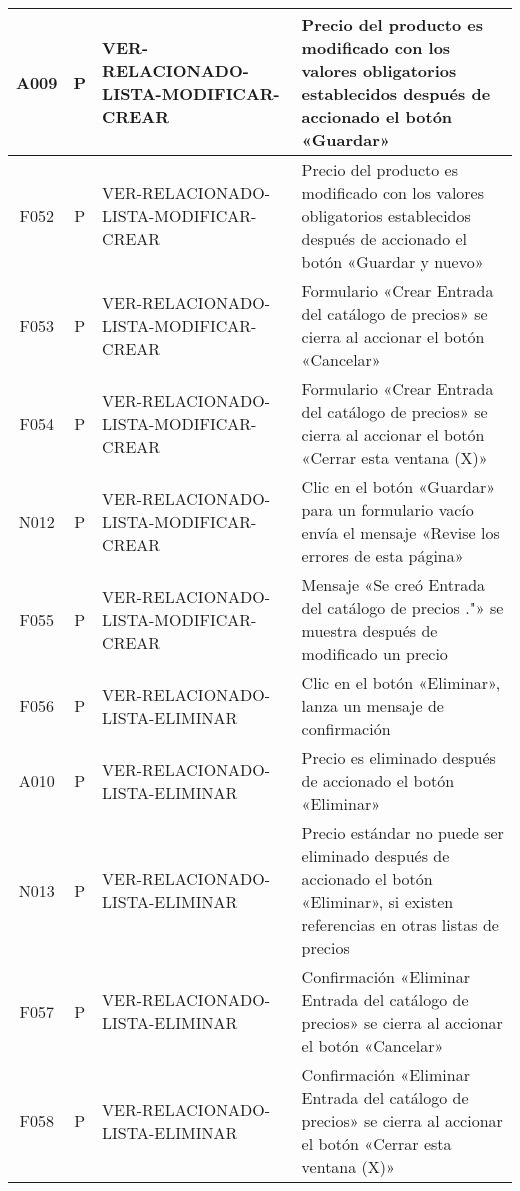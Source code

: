 \begin{landscape}
{\begin{longtable}[htb]{|c|c|p{3.8cm}|p{15.2cm}|}
\scriptsize{A009} & \scriptsize{P} & \scriptsize{VER-RELACIONADO-LISTA-MODIFICAR-CREAR} & \scriptsize{Precio del producto es modificado con los valores obligatorios establecidos después de accionado el botón «Guardar»} \\ \hline
\scriptsize{F052} & \scriptsize{P} & \scriptsize{VER-RELACIONADO-LISTA-MODIFICAR-CREAR} & \scriptsize{Precio del producto es modificado con los valores obligatorios establecidos después de accionado el botón «Guardar y nuevo»} \\ \hline
\scriptsize{F053} & \scriptsize{P} & \scriptsize{VER-RELACIONADO-LISTA-MODIFICAR-CREAR} & \scriptsize{Formulario «Crear Entrada del catálogo de precios» se cierra al accionar el botón «Cancelar»} \\ \hline
\scriptsize{F054} & \scriptsize{P} & \scriptsize{VER-RELACIONADO-LISTA-MODIFICAR-CREAR} & \scriptsize{Formulario «Crear Entrada del catálogo de precios» se cierra al accionar el botón «Cerrar esta ventana (X)»} \\ \hline
\scriptsize{N012} & \scriptsize{P} & \scriptsize{VER-RELACIONADO-LISTA-MODIFICAR-CREAR} & \scriptsize{Clic en el botón «Guardar» para un formulario vacío envía el mensaje «Revise los errores de esta página»} \\ \hline
\scriptsize{F055} & \scriptsize{P} & \scriptsize{VER-RELACIONADO-LISTA-MODIFICAR-CREAR} & \scriptsize{Mensaje «Se creó Entrada del catálogo de precios ."» se muestra después de modificado un precio} \\ \hline
\scriptsize{F056} & \scriptsize{P} & \scriptsize{VER-RELACIONADO-LISTA-ELIMINAR} & \scriptsize{Clic en el botón «Eliminar», lanza un mensaje de confirmación} \\ \hline
\scriptsize{A010} & \scriptsize{P} & \scriptsize{VER-RELACIONADO-LISTA-ELIMINAR} & \scriptsize{Precio es eliminado después de accionado el botón «Eliminar»} \\ \hline
\scriptsize{N013} & \scriptsize{P} & \scriptsize{VER-RELACIONADO-LISTA-ELIMINAR} & \scriptsize{Precio estándar no puede ser eliminado después de accionado el botón «Eliminar», si existen referencias en otras listas de precios} \\ \hline
\scriptsize{F057} & \scriptsize{P} & \scriptsize{VER-RELACIONADO-LISTA-ELIMINAR} & \scriptsize{Confirmación «Eliminar Entrada del catálogo de precios» se cierra al accionar el botón «Cancelar»} \\ \hline
\scriptsize{F058} & \scriptsize{P} & \scriptsize{VER-RELACIONADO-LISTA-ELIMINAR} & \scriptsize{Confirmación «Eliminar Entrada del catálogo de precios» se cierra al accionar el botón «Cerrar esta ventana (X)»} \\ \hline

\end{longtable}}
\end{landscape}
